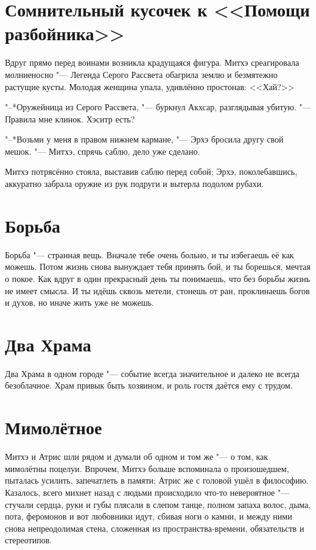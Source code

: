 \documentclass[a4paper,10pt,fleqn]{book}
\newcommand{\ldotst}{\so{...}\xspace}
\begin{document}
\section{Сомнительный кусочек к <<Помощи разбойника>>}

Вдруг прямо перед воинами возникла крадущаяся фигура.
Митхэ среагировала молниеносно "--- Легенда Серого Рассвета обагрила землю и безмятежно растущие кусты.
Молодая женщина упала, удивлённо простонав: <<Хай?>>

"--*Оружейница из Серого Рассвета, "--- буркнул Акхсар, разглядывая убитую.
"--- Правила мне клинок.
Хэситр есть?

"--*Возьми у меня в правом нижнем кармане, "--- Эрхэ бросила другу свой мешок.
"--- Митхэ, спрячь саблю, дело уже сделано.

Митхэ потрясённо стояла, выставив саблю перед собой;
Эрхэ, поколебавшись, аккуратно забрала оружие из рук подруги и вытерла подолом рубахи.

\section{Борьба}

Борьба "--- странная вещь.
Вначале тебе очень больно, и ты избегаешь её как можешь.
Потом жизнь снова вынуждает тебя принять бой, и ты борешься, мечтая о покое.
Как вдруг в один прекрасный день ты понимаешь, что без борьбы жизнь не имеет смысла.
И ты идёшь сквозь метели, стонешь от ран, проклинаешь богов и духов, но иначе жить уже не можешь.

\section{Два Храма}

Два Храма в одном городе "--- событие всегда значительное и далеко не всегда безоблачное.
Храм привык быть хозяином, и роль гостя даётся ему с трудом.

\section{Мимолётное}

Митхэ и Атрис шли рядом и думали об одном и том же "--- о том, как мимолётны поцелуи.
Впрочем, Митхэ больше вспоминала о произошедшем, пыталась усилить, запечатлеть в памяти;
Атрис же с головой ушёл в философию.
Казалось, всего михнет назад с людьми происходило что-то невероятное "--- стучали сердца, руки и губы плясали в слепом танце, полном запаха волос, дыма, пота, феромонов\ldotst и вот любовники идут, сбивая ноги о камни, и между ними снова непреодолимая стена, сложенная из пространства-времени, обязательств и стереотипов.
\end{document}

